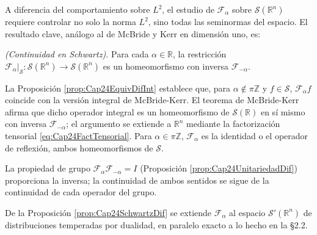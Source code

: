             A diferencia del comportamiento sobre $L^2$, el estudio de $\mathcal{F}_\alpha$ sobre $\mathcal{S}(\mathbb{R}^n)$ requiere controlar no solo la norma $L^2$, sino todas las seminormas del espacio. El resultado clave, análogo al de McBride y Kerr en dimensión uno, es:

            \begin{proposition}\label{prop:Cap24SchwartzDif}
                \textit{(Continuidad en Schwartz).} Para cada $\alpha \in \mathbb{R}$, la restricción $\mathcal{F}_\alpha\big|_{\mathcal{S}} : \mathcal{S}(\mathbb{R}^n) \to \mathcal{S}(\mathbb{R}^n)$ es un homeomorfismo con inversa $\mathcal{F}_{-\alpha}$.
            \end{proposition}
            \begin{Proof}
                La Proposición \ref{prop:Cap24EquivDifInt} establece que, para $\alpha \notin \pi\mathbb{Z}$ y $f\in \mathcal{S}$, $\mathcal{F}_\alpha f$ coincide con la versión integral de McBride-Kerr. El teorema de McBride-Kerr \citep{mcbride1987namias} afirma que dicho operador integral es un homeomorfismo de $\mathcal{S}(\mathbb{R})$ en sí mismo con inversa $\mathcal{F}_{-\alpha}$; el argumento se extiende a $\mathbb{R}^n$ mediante la factorización tensorial \eqref{eq:Cap24FactTensorial}. Para $\alpha\in\pi\mathbb{Z}$, $\mathcal{F}_\alpha$ es la identidad o el operador de reflexión, ambos homeomorfismos de $\mathcal{S}$.

                La propiedad de grupo $\mathcal{F}_\alpha \mathcal{F}_{-\alpha} = I$ (Proposición \ref{prop:Cap24UnitariedadDif}) proporciona la inversa; la continuidad de ambos sentidos se sigue de la continuidad de cada operador del grupo.
            \end{Proof}

            De la Proposición \ref{prop:Cap24SchwartzDif} se extiende $\mathcal{F}_\alpha$ al espacio $\mathcal{S}'(\mathbb{R}^n)$ de distribuciones temperadas por dualidad, en paralelo exacto a lo hecho en la §2.2.


